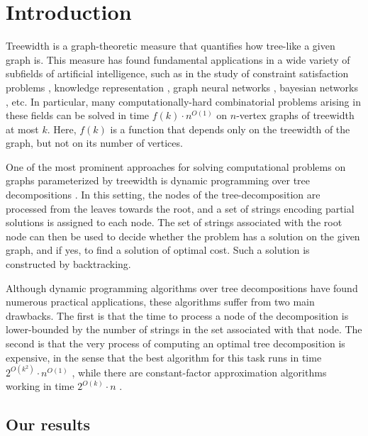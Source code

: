 \section{Introduction}
Treewidth is a graph-theoretic measure that quantifies how tree-like a given graph is. This measure has found fundamental applications in a wide variety of subfields of artificial intelligence, such as in the study of constraint satisfaction problems \cite{dalmau2002constraint,samer2010constraint}, knowledge representation \cite{gottlob2010bounded}, graph neural networks \cite{barcelo2021graph}, bayesian networks \cite{elidan2008learning}, etc. In particular, many computationally-hard combinatorial problems arising in these fields can be solved in time $f(k)\cdot n^{O(1)}$ on $n$-vertex graphs of treewidth at most $k$. Here, $f(k)$ is a function that depends only on the treewidth of the graph, but not on its number of vertices. 

One of the most prominent approaches for solving computational problems on graphs parameterized by treewidth is dynamic programming over tree decompositions \cite{Baste2022,From2023,hagerup2000dynamic}. In this setting, the nodes of the tree-decomposition are processed from the leaves towards the root, and a set of strings encoding partial solutions is assigned to each node. The set of strings associated with the root node can then be used to decide whether the problem has a solution on the given graph, and if yes, to find a solution of optimal cost. Such a solution is constructed by backtracking. 

Although dynamic programming algorithms over tree decompositions have found numerous practical applications, these algorithms suffer from two main drawbacks. The first is that the time to process a node of the decomposition is lower-bounded by the number of strings in the set associated with that node. The second is that the very process of computing an optimal tree decomposition is expensive, in the sense that the best algorithm for this task runs in time $2^{O(k^2)}\cdot n^{O(1)}$ \cite{korhonen2023improved}, while there are constant-factor approximation algorithms working in time $2^{O(k)}\cdot n$ \cite{korhonen2023single}. 

\subsection{Our results}


